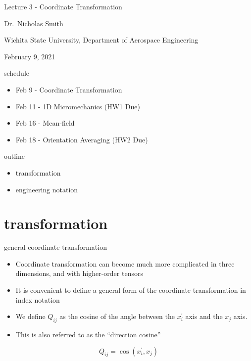\documentclass[
  letterpaper,
  ignorenonframetext,
  aspectratio=43,
  handout,
  12pt]{beamer}
\author{}
\date{}
\providecommand{\tightlist}{%
  \setlength{\itemsep}{0pt}\setlength{\parskip}{0pt}}
\providecommand{\tightlist}{%
\setlength{\itemsep}{0pt}\setlength{\parskip}{0pt}}
\begin{document}
\begin{frame}
Lecture 3 - Coordinate Transformation

Dr.~Nicholas Smith

Wichita State University, Department of Aerospace Engineering

February 9, 2021
\end{frame}

\begin{frame}{schedule}
\protect\hypertarget{schedule}{}
\begin{itemize}
\tightlist
\item
  Feb 9 - Coordinate Transformation
\item
  Feb 11 - 1D Micromechanics (HW1 Due)
\item
  Feb 16 - Mean-field
\item
  Feb 18 - Orientation Averaging (HW2 Due)
\end{itemize}
\end{frame}

\begin{frame}{outline}
\protect\hypertarget{outline}{}
\begin{itemize}
\tightlist
\item
  transformation
\item
  engineering notation
\end{itemize}
\end{frame}

\hypertarget{transformation}{%
\section{transformation}\label{transformation}}

\begin{frame}{general coordinate transformation}
\protect\hypertarget{general-coordinate-transformation}{}
\begin{itemize}
\tightlist
\item
  Coordinate transformation can become much more complicated in three
  dimensions, and with higher-order tensors
\item
  It is convenient to define a general form of the coordinate
  transformation in index notation
\item
  We define \(Q_{ij}\) as the cosine of the angle between the
  \(x_i^\prime\) axis and the \(x_j\) axis.
\item
  This is also referred to as the ``direction cosine''
\end{itemize}

\[Q_{ij} = \cos(x_i^\prime, x_j)\]
\end{frame}
\end{document}
